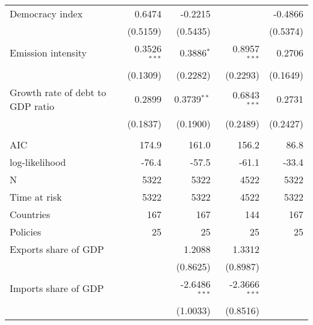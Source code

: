 \begin{tabular}{lrrrr}
Democracy index                  &            0.6474 &            -0.2215 &                    &           -0.4866 \\
                                 &          (0.5159) &           (0.5435) &                    &          (0.5374) \\
Emission intensity               &  0.3526$^{* * *}$ &       0.3886$^{*}$ &   0.8957$^{* * *}$ &            0.2706 \\
                                 &          (0.1309) &           (0.2282) &           (0.2293) &          (0.1649) \\
Growth rate of debt to GDP ratio &            0.2899 &     0.3739$^{* *}$ &   0.6843$^{* * *}$ &            0.2731 \\
                                 &          (0.1837) &           (0.1900) &           (0.2489) &          (0.2427) \\
                                 &                   &                    &                    &                   \\
AIC                              &             174.9 &              161.0 &              156.2 &              86.8 \\
log-likelihood                   &             -76.4 &              -57.5 &              -61.1 &             -33.4 \\
N                                &              5322 &               5322 &               4522 &              5322 \\
Time at risk                     &              5322 &               5322 &               4522 &              5322 \\
Countries                        &               167 &                167 &                144 &               167 \\
Policies                         &                25 &                 25 &                 25 &                25 \\
Exports share of GDP             &                   &             1.2088 &             1.3312 &                   \\
                                 &                   &           (0.8625) &           (0.8987) &                   \\
Imports share of GDP             &                   &  -2.6486$^{* * *}$ &  -2.3666$^{* * *}$ &                   \\
                                 &                   &           (1.0033) &           (0.8516) &                   \\

\end{tabular}
